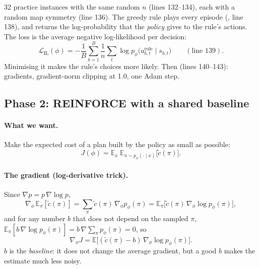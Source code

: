 32 practice instances with the same random $n$ (lines 132--134), each with a random map symmetry (line 136). The greedy rule plays every episode (, line 138), and  returns the log-probability that the \emph{policy} gives to the rule's actions. The loss is the average negative log-likelihood per decision:
\[
\mathcal L_{\text{IL}}(\phi)=-\frac{1}{B}\sum_{b=1}^{B}\frac1n\sum_t\log p_\phi\big(a^{\text{rule}}_{b,t}\mid s_{b,t}\big)\qquad(\text{line 139}).
\]
Minimising it makes the rule's choices more likely. Then (lines 140--143): gradients, gradient-norm clipping at 1.0, one Adam step.

\subsection{Phase 2: REINFORCE with a shared baseline}


\paragraph{What we want.} Make the expected cost of a plan built by the policy as small as possible:
\[
J(\phi)=\mathbb E_{x}\ \mathbb E_{\pi\sim p_\phi(\cdot\mid x)}\big[\tilde c(\pi)\big].
\]

\paragraph{The gradient (log-derivative trick).} Since $\nabla p=p\,\nabla\log p$,
\[
\nabla_\phi\,\mathbb E_\pi[\tilde c(\pi)]=\sum_\pi\tilde c(\pi)\,\nabla_\phi p_\phi(\pi)=\mathbb E_\pi\big[\tilde c(\pi)\,\nabla_\phi\log p_\phi(\pi)\big],
\]
and for any number $b$ that does not depend on the sampled $\pi$, $\mathbb E_\pi[b\,\nabla\log p_\phi(\pi)]=b\,\nabla\sum_\pi p_\phi(\pi)=0$, so
\[
\nabla_\phi J=\mathbb E\big[(\tilde c(\pi)-b)\,\nabla_\phi\log p_\phi(\pi)\big].
\]
$b$ is the \emph{baseline}: it does not change the average gradient, but a good $b$ makes the estimate much less noisy.


